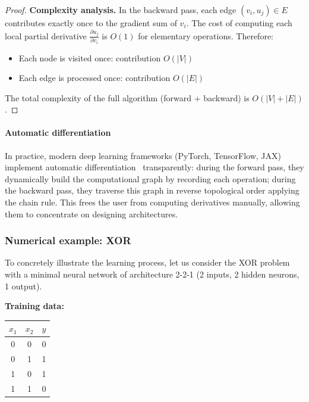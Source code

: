 \begin{proof}
	\textbf{Complexity analysis.}
	In the backward pass, each edge \((v_i, u_j) \in E\) contributes exactly once to the gradient sum of \(v_i\). The cost of computing each local partial derivative \(\frac{\partial u_j}{\partial v_i}\) is \(O(1)\) for elementary operations. Therefore:
	\begin{itemize}
		\item Each node is visited once: contribution \(O(|V|)\)
		\item Each edge is processed once: contribution \(O(|E|)\)
	\end{itemize}

	The total complexity of the full algorithm (forward + backward) is \(O(|V| + |E|)\).
\end{proof}

\paragraph{Automatic differentiation}
In practice, modern deep learning frameworks (PyTorch, TensorFlow, JAX) implement automatic differentiation~\citep{Neidinger2010IntroductionTA} transparently: during the forward pass, they dynamically build the computational graph by recording each operation; during the backward pass, they traverse this graph in reverse topological order applying the chain rule. This frees the user from computing derivatives manually, allowing them to concentrate on designing architectures.

\subsubsection{Numerical example: XOR}

To concretely illustrate the learning process, let us consider the XOR problem with a minimal neural network of architecture 2-2-1 (2 inputs, 2 hidden neurons, 1 output).

\textbf{Training data:}
\begin{center}
	\begin{tabular}{cc|c}
		\(x_1\) & \(x_2\) & \(y\) \\
		\hline
		0       & 0       & 0     \\
		0       & 1       & 1     \\
		1       & 0       & 1     \\
		1       & 1       & 0     \\
	\end{tabular}
\end{center}

